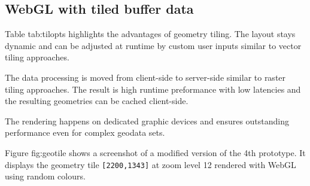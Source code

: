     \subsection{WebGL with tiled buffer data}
      Table {tab:tilopts} highlights the advantages of geometry tiling. The layout stays dynamic and can be adjusted at runtime by custom user inputs similar to vector tiling approaches.\par
      The data processing is moved from client-side to server-side similar to raster tiling approaches. The result is high runtime preformance with low latencies and the resulting geometries can be cached client-side.\par
      The rendering happens on dedicated graphic devices and ensures outstanding performance even for complex geodata sets.

      Figure {fig:geotile} shows a screenshot of a modified version of the 4th prototype. It displays the geometry tile \texttt{[2200,1343]} at zoom level 12 rendered with WebGL using random colours.

